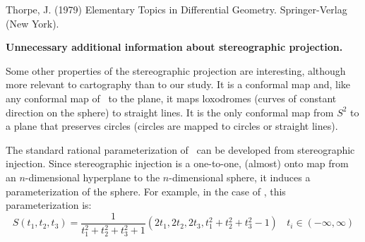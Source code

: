 \documentclass[12pt]{article}
\begin{document}
{%

Thorpe, J. (1979)
Elementary Topics in Differential Geometry.
Springer-Verlag (New York).
}


{\bf Unnecessary additional information about stereographic projection.}

Some other properties of the stereographic projection are interesting, although
more relevant to cartography than to our study.
It is a conformal map and, like any conformal map of \ to the plane,
it maps loxodromes (curves of constant direction on the sphere) to straight lines.
It is the only conformal map from $S^2$ to a plane that preserves
circles (circles are mapped to circles or straight lines).

The standard rational parameterization of \ 
can be developed from stereographic injection.
Since stereographic injection is a one-to-one, 
(almost) onto map from an $n$-dimensional
hyperplane to the $n$-dimensional sphere, 
it induces a parameterization of the sphere.
For example, in the case of , this parameterization is:
\begin{equation}
	S(t_1,t_2,t_3) = 
	\frac{1}{t_1^2 + t_2^2 + t_3^2 + 1} 
	(2t_1, 2t_2, 2t_3, t_1^2 + t_2^2 + t_3^2 - 1) \ \ \ \ t_i \in (-\infty,\infty)
\end{equation}

\end{document}
